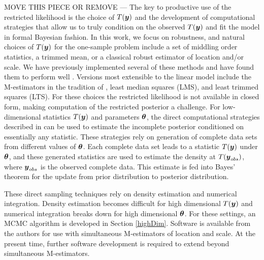 \documentclass[11pt]{article}
\def\bth{\mbox{\boldmath $\theta$}}
\newcommand{\by}{\mbox{\boldmath $y$}}
\newcommand{\red}[1]{{\color{red}#1}}
\begin{document}
\red{ MOVE THIS PIECE OR REMOVE ---
The key to productive use of the restricted likelihood is the choice of $T(\by)$ and the development
of computational strategies that allow us to truly condition on the observed $T(\by)$ and 
fit the model in formal Bayesian fashion.  In this work, we focus
on robustness, and natural choices of $T(\by)$ for the one-sample problem include a set of middling order statistics, a trimmed
mean, or a classical robust estimator of location and/or scale.  
We have previously implemented several of these methods and have found them to perform well \citep[][]{lewis2012}. Versions most extensible to the linear model include the M-estimators in the tradition of \cite{huber1964}, least median squares (LMS), and least trimmed squares (LTS). For these choices the restricted likelihood is not available in closed form, making computation of the restricted posterior a challenge. For low-dimensional statistics $T(\by)$ and parameters $\bth$, the direct computational strategies described in \cite{lewis2014} can be used to estimate the incomplete posterior conditioned on essentially any statistic.  These strategies rely on generation of complete data sets from different values of $\bth$.  
Each complete data set leads to a statistic $T(\by)$ under $\bth$, and these generated statistics are used to estimate the density at $T(\by_{obs})$, where $\by_{obs}$ is the observed complete data. This estimate is fed into Bayes' theorem for the update from prior distribution to posterior distribution.  %

These direct sampling techniques rely on density estimation and numerical integration. Density estimation becomes difficult for high dimensional $T(\by)$ and numerical integration breaks down for high dimensional $\bth$. For these settings, an MCMC algorithm is developed in Section \ref{highDim}. Software is available from the authors for use with simultaneous M-estimators of location and scale. At the present time, further software development is required to extend beyond simultaneous M-estimators.  

}
\end{document}
